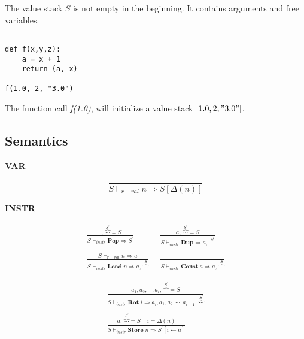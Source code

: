 \documentclass[12pt, a4paper]{report}
\newcommand{\rulegroup}[1]{
    \textbf{#1}
}
\begin{document}
The value stack $S$ is not empty in the beginning. It contains arguments and free variables.

\begin{lstlisting}

def f(x,y,z):
    a = x + 1
    return (a, x)

f(1.0, 2, "3.0")

\end{lstlisting}
The function call \textit{f(1.0)}, will initialize a value stack $[1.0, 2, "3.0"]$.

\subsection*{Semantics}


\hrulefill

\rulegroup{VAR}

\begin{equation*}
\frac{}{S \vdash_{r-val} n \Rightarrow S[\Delta(n)]}
\end{equation*}    

\hrulefill
\bigbreak

\rulegroup{INSTR}

\begin{equation*}
\begin{split}
\frac{
    \_ , \; \overbrace{\cdots}^{S^{'}} = S
}{
    S \vdash_{instr} \mathbf{Pop} \Rightarrow S^{'}
}
\;\;
& \frac{
    a, \; \overbrace{\cdots}^{S^{'}} = S
}{
    S \vdash_{instr} \mathbf{Dup} \Rightarrow a, \; \overbrace{\cdots}^{S}
}
\\\\
\frac{S \vdash_{r-val} n \Rightarrow a}
     {S \vdash_{instr} \mathbf{Load}\; n \Rightarrow a, \; \overbrace{\cdots}^{S} }
\;\;
& \frac{}
     {S \vdash_{instr} \mathbf{Const}\; a \Rightarrow a, \; \overbrace{\cdots}^{S}}
\end{split}
\end{equation*}

\begin{equation*}
\begin{split}
\frac{
    a_1, a_2, \cdots, a_i, \; \overbrace{\cdots}^{S^{'}} = S
}{
    S \vdash_{instr} \mathbf{Rot} \; i \Rightarrow a_i, a_1, a_2, \cdots, a_{i - 1},\; \overbrace{\cdots}^{S^{'}}
}
\\\\
\frac{ a,\; \overbrace{\cdots}^{S^{'}} = S \;\;\;\; i = \Delta(n) }
        { S \vdash_{instr} \mathbf{Store} \; n \Rightarrow S^{'}[i \leftarrow a]}
\end{split}
\end{equation*}
\end{document}
